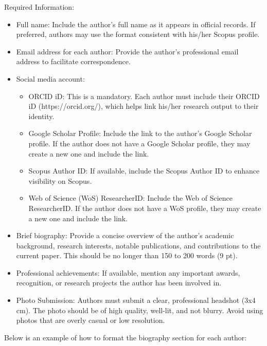 \documentclass{iaesarticle}
\begin{document}
\noindent Required Information:
\begin{itemize}[topsep=0.3ex, itemsep=0.3ex, parsep=0.2ex]
	\item[-] Full name: Include the author's full name as it appears in official records. If preferred, authors may use the format consistent with his/her Scopus profile.
	\item[-] Email address for each author: Provide the author's professional email address to facilitate correspondence.
	\item[-] Social media account:
	\begin{itemize}[topsep=0.3ex, itemsep=0.3ex, parsep=0.2ex]
		\item[$\blacksquare$] ORCID iD: This is a mandatory. Each author must include their ORCID iD (https://orcid.org/), which helps link his/her research output to their identity.
		\item[$\blacksquare$] Google Scholar Profile: Include the link to the author's Google Scholar profile. If the author does not have a Google Scholar profile, they may create a new one and include the link.
		\item[$\blacksquare$] Scopus Author ID: If available, include the Scopus Author ID to enhance visibility on Scopus.
		\item[$\blacksquare$] Web of Science (WoS) ResearcherID: Include the Web of Science ResearcherID. If the author does not have a WoS profile, they may create a new one and include the link.
	\end{itemize}
	\item[-] Brief biography: Provide a concise overview of the author's academic background, research interests, notable publications, and contributions to the current paper. This should be no longer than 150 to 200 words (9 pt).
	\item[-] Professional achievements: If available, mention any important awards, recognition, or research projects the author has been involved in.
	\item[-] Photo Submission: Authors must submit a clear, professional headshot (3x4 cm). The photo should be of high quality, well-lit, and not blurry. Avoid using photos that are overly casual or low resolution.
\end{itemize}


\noindent Below is an example of how to format the biography section for each author:
\end{document}
